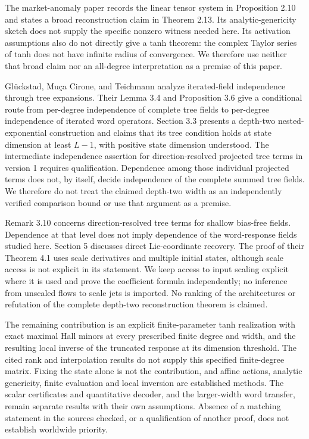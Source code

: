 \documentclass[11pt,a4paper]{article}
\numberwithin{equation}{section}
\theoremstyle{definition}
\theoremstyle{remark}
\begin{document}
The market-anomaly paper records the linear tensor system in Proposition
2.10 and states a broad reconstruction claim in Theorem 2.13. Its
analytic-genericity sketch does not supply the specific nonzero witness
needed here. Its activation assumptions also do not directly give a
tanh theorem: the complex Taylor series of tanh does not have infinite
radius of convergence. We therefore use neither that broad claim nor
an all-degree interpretation as a premise of this paper.

Gl\"uckstad, Mu\c{c}a Cirone, and Teichmann \cite{Gluckstad} analyze
iterated-field independence through tree expansions. Their Lemma 3.4 and
Proposition 3.6 give a conditional route from per-degree independence of
complete tree fields to per-degree independence of iterated word operators.
Section 3.3 presents a depth-two nested-exponential construction and claims
that its tree condition holds at state dimension at least $L-1$, with
positive state dimension understood. The intermediate independence
assertion for direction-resolved projected tree terms in version 1 requires
qualification. Dependence among those individual projected terms does not,
by itself, decide independence of the complete summed tree fields. We
therefore do not treat the claimed depth-two width as an independently
verified comparison bound or use that argument as a premise.

Remark 3.10 concerns direction-resolved tree terms for shallow bias-free
fields. Dependence at that level does not imply dependence of the
word-response fields studied here. Section 5 discusses direct
Lie-coordinate recovery. The proof of their Theorem 4.1 uses scale
derivatives and multiple initial states, although scale access is not
explicit in its statement. We keep access to input scaling explicit
where it is used and prove the coefficient formula independently;
no inference from unscaled flows to scale jets is imported. No ranking of the architectures or
refutation of the complete depth-two reconstruction theorem is claimed.

The remaining contribution is an explicit finite-parameter tanh
realization with exact maximal Hall minors at every prescribed finite
degree and width, and the resulting local inverse of the truncated
response at its dimension threshold. The cited rank and interpolation
results do not supply this specified finite-degree matrix. Fixing the
state alone is not the contribution, and affine actions, analytic
genericity, finite evaluation and local inversion are established methods.
The scalar certificates and quantitative decoder, and the larger-width
word transfer, remain separate results with their own assumptions.
Absence of a matching statement in the sources checked, or a qualification
of another proof, does not establish worldwide priority.
\end{document}
